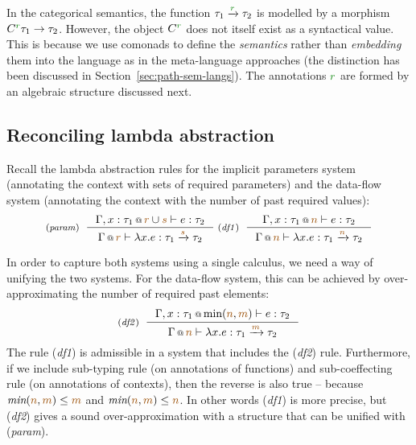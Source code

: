 In the categorical semantics, the function $\tau_1 \xrightarrow{\cclrd{r}} \tau_2$ is modelled
by a morphism $C^{\cclrd{r}} \tau_1 \rightarrow \tau_2$. However, the object $C^{\cclrd{r}}$
does not itself exist as a syntactical value. This is because we use comonads to define the 
\emph{semantics} rather than \emph{embedding} them into the language as in the meta-language
approaches (the distinction has been discussed in Section~\ref{sec:path-sem-langs}). The annotations
$\cclrd{r}$ are formed by an algebraic structure discussed next.


\subsection{Reconciling lambda abstraction}
\label{sec:flat-calculus-lambda}

Recall the lambda abstraction rules for the implicit parameters system (annotating the context
with sets of required parameters) and the data-flow system (annotating the context with the
number of past required values):
%
\begin{equation*}
\tyrule{param}
  {\coctx{\Gamma, x:\tau_1}{\aclrd{r} \cup \aclrd{s}} \vdash e : \tau_2}
  {\coctx{\Gamma}{\aclrd{r}} \vdash \lambda x.e : \tau_1 \xrightarrow{\aclrd{s}} \tau_2 }
\;
\tyrule{df1}
  {\coctx{\Gamma, x:\tau_1}{\aclrd{n}} \vdash e : \tau_2}
  {\coctx{\Gamma}{\aclrd{n}} \vdash \lambda x.e : \tau_1 \xrightarrow{\aclrd{n}} \tau_2 }
\end{equation*}

In order to capture both systems using a single calculus, we need a way of unifying the two
systems. For the data-flow system, this can be achieved by over-approximating the number of 
required past elements:
%
\begin{equation*}
\tyrule{df2}
  {\coctx{\Gamma, x:\tau_1}{\textnormal{min}(\aclrd{n}, \aclrd{m})} \vdash e : \tau_2}
  {\coctx{\Gamma}{\aclrd{n}} \vdash \lambda x.e : \tau_1 \xrightarrow{\aclrd{m}} \tau_2 }
\end{equation*}
%
The rule (\emph{df1}) is admissible in a system that includes the (\emph{df2}) rule. 
Furthermore, if we include sub-typing rule (on annotations of functions) and sub-coeffecting rule (on 
annotations of contexts), then the reverse is also true -- because 
$\textit{min}(\aclrd{n}, \aclrd{m}) \leq \aclrd{m}$ and $\textit{min}(\aclrd{n}, \aclrd{m}) \leq \aclrd{n}$.
In other words (\emph{df1}) is more precise, but (\emph{df2}) gives a sound over-approximation
with a structure that can be unified with (\emph{param}).

